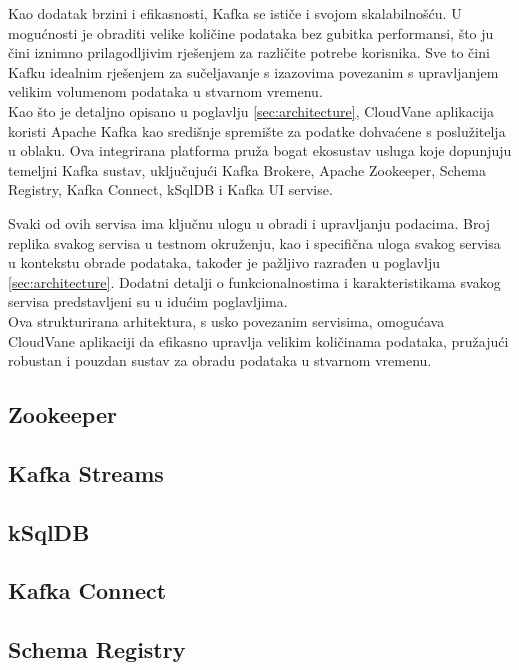 \documentclass[times, utf8, diplomski]{fer}
\begin{document}
Kao dodatak brzini i efikasnosti, Kafka se ističe i svojom skalabilnošću. U mogućnosti je obraditi velike količine podataka bez gubitka performansi, što ju čini iznimno prilagodljivim rješenjem za različite potrebe korisnika. Sve to čini Kafku idealnim rješenjem za sučeljavanje s izazovima povezanim s upravljanjem velikim volumenom podataka u stvarnom vremenu. \\

Kao što je detaljno opisano u poglavlju \ref{sec:architecture}, CloudVane aplikacija koristi Apache Kafka kao središnje spremište za podatke dohvaćene s poslužitelja u oblaku. Ova integrirana platforma pruža bogat ekosustav usluga koje dopunjuju temeljni Kafka sustav, uključujući Kafka Brokere, Apache Zookeeper, Schema Registry, Kafka Connect, kSqlDB i Kafka UI servise.

Svaki od ovih servisa ima ključnu ulogu u obradi i upravljanju podacima. Broj replika svakog servisa u testnom okruženju, kao i specifična uloga svakog servisa u kontekstu obrade podataka, također je pažljivo razrađen u poglavlju \ref{sec:architecture}. Dodatni detalji o funkcionalnostima i karakteristikama svakog servisa predstavljeni su u idućim poglavljima. \\

Ova strukturirana arhitektura, s usko povezanim servisima, omogućava CloudVane aplikaciji da efikasno upravlja velikim količinama podataka, pružajući robustan i pouzdan sustav za obradu podataka u stvarnom vremenu.

\subsection{Zookeeper}

\subsection{Kafka Streams}

\subsection{kSqlDB}

\subsection{Kafka Connect}

\subsection{Schema Registry}
\end{document}
